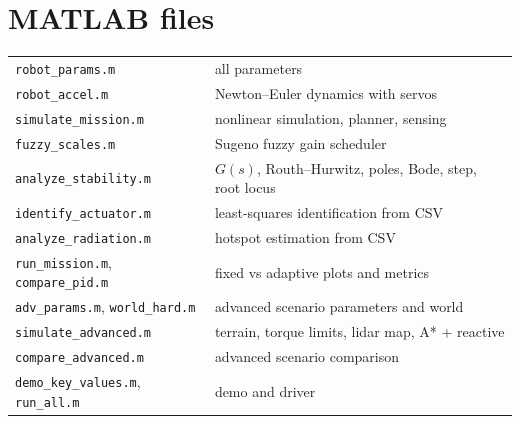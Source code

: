 \documentclass[11pt,a4paper]{article}
\begin{document}
\section*{MATLAB files}
\begin{tabular}{@{}ll@{}}
\texttt{robot\_params.m} & all parameters\\
\texttt{robot\_accel.m} & Newton--Euler dynamics with servos\\
\texttt{simulate\_mission.m} & nonlinear simulation, planner, sensing\\
\texttt{fuzzy\_scales.m} & Sugeno fuzzy gain scheduler\\
\texttt{analyze\_stability.m} & $G(s)$, Routh--Hurwitz, poles, Bode, step, root locus\\
\texttt{identify\_actuator.m} & least-squares identification from CSV\\
\texttt{analyze\_radiation.m} & hotspot estimation from CSV\\
\texttt{run\_mission.m}, \texttt{compare\_pid.m} & fixed vs adaptive plots and metrics\\
\texttt{adv\_params.m}, \texttt{world\_hard.m} & advanced scenario parameters and world\\
\texttt{simulate\_advanced.m} & terrain, torque limits, lidar map, A* + reactive\\
\texttt{compare\_advanced.m} & advanced scenario comparison\\
\texttt{demo\_key\_values.m}, \texttt{run\_all.m} & demo and driver\\
\end{tabular}
\end{document}
